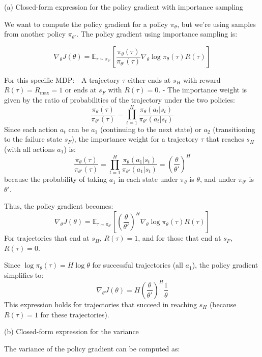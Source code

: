 \documentclass{article}
\begin{document}
\begin{enumerate}
\begin{enumerate}
    (a) Closed-form expression for the policy gradient with importance sampling
    
    We want to compute the policy gradient for a policy \( \pi_\theta \), but we're using samples from another policy \( \pi_{\theta'} \). The policy gradient using importance sampling is:
    
    \[
    \nabla_\theta J(\theta) = \mathbb{E}_{\tau \sim \pi_{\theta'}} \left[ \frac{\pi_\theta(\tau)}{\pi_{\theta'}(\tau)} \nabla_\theta \log \pi_\theta(\tau) R(\tau) \right]
    \]
    
    For this specific MDP:
    - A trajectory \( \tau \) either ends at \( s_H \) with reward \( R(\tau) = R_{\text{max}} = 1 \) or ends at \( s_F \) with \( R(\tau) = 0 \).
    - The importance weight is given by the ratio of probabilities of the trajectory under the two policies:
    \[
    \frac{\pi_\theta(\tau)}{\pi_{\theta'}(\tau)} = \prod_{t=1}^{H} \frac{\pi_\theta(a_t | s_t)}{\pi_{\theta'}(a_t | s_t)}
    \]
    Since each action \( a_t \) can be \( a_1 \) (continuing to the next state) or \( a_2 \) (transitioning to the failure state \( s_F \)), the importance weight for a trajectory \( \tau \) that reaches \( s_H \) (with all actions \( a_1 \)) is:
    \[
    \frac{\pi_\theta(\tau)}{\pi_{\theta'}(\tau)} = \prod_{t=1}^{H} \frac{\pi_\theta(a_1 | s_t)}{\pi_{\theta'}(a_1 | s_t)} = \left( \frac{\theta}{\theta'} \right)^H
    \]
    because the probability of taking \( a_1 \) in each state under \( \pi_\theta \) is \( \theta \), and under \( \pi_{\theta'} \) is \( \theta' \).
    
    Thus, the policy gradient becomes:
    \[
    \nabla_\theta J(\theta) = \mathbb{E}_{\tau \sim \pi_{\theta'}} \left[ \left( \frac{\theta}{\theta'} \right)^H \nabla_\theta \log \pi_\theta(\tau) R(\tau) \right]
    \]
    For trajectories that end at \( s_H \), \( R(\tau) = 1 \), and for those that end at \( s_F \), \( R(\tau) = 0 \).
    
    Since \( \log \pi_\theta(\tau) = H \log \theta \) for successful trajectories (all \( a_1 \)), the policy gradient simplifies to:
    \[
    \nabla_\theta J(\theta) = H \left( \frac{\theta}{\theta'} \right)^H \frac{1}{\theta}
    \]
    This expression holds for trajectories that succeed in reaching \( s_H \) (because \( R(\tau) = 1 \) for these trajectories).
    
    (b) Closed-form expression for the variance
    
    The variance of the policy gradient can be computed as:
    

\end{enumerate}
\end{enumerate}
\end{document}
